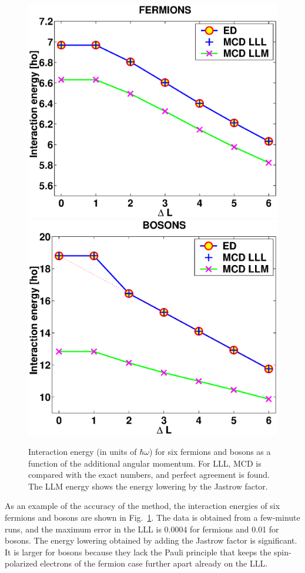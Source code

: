\documentclass{article}
\begin{document}
\begin{figure}[hbt]
  \includegraphics[width=0.49\columnwidth]{ED_vs_MCD_fermions_6.eps}
  \includegraphics[width=0.49\columnwidth]{ED_vs_MCD_boson_6.eps}
\caption{Interaction energy (in units of $\hbar \omega$) for six
fermions and bosons as a function of the additional angular
momentum. For LLL, MCD is compared with the exact numbers, and perfect
agreement is found. The LLM energy shows the energy lowering by the
Jastrow factor.}
\label{MCD}
\end{figure}
As an example of the accuracy of the method, the interaction energies
of six fermions and bosons are shown in Fig.~\ref{MCD}. The data is
obtained from a few-minute runs, and the maximum error in the LLL is
0.0004 for fermions and 0.01 for bosons. The energy lowering obtained
by adding the Jastrow factor is significant. It is larger for bosons
because they lack the Pauli principle that keeps the spin-polarized
electrons of the fermion case further apart already on the LLL.
\end{document}
